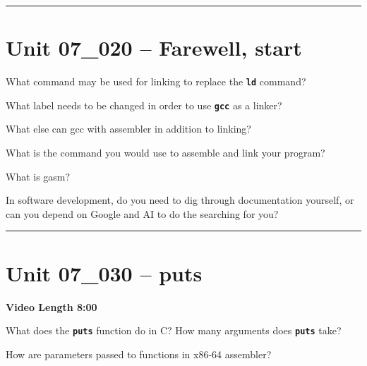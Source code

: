 \documentclass[letterpaper,12pt]{exam}
\newcommand{\unit}{Unit 07}
\begin{document}
\begin{questions}
\rule{0.5\textwidth}{.4pt} %
\section*{\unit\_020 -- Farewell, start }

\begin{samepage}
    \question What command may be used for linking to replace the \texttt{\textbf{ld}} command?
    \vspace{5mm}
\end{samepage}
\par
\begin{samepage}
    \question What label needs to be changed in order to use \texttt{\textbf{gcc}} as a linker?
    \vspace{5mm}
\end{samepage}
\par
 
\begin{samepage}
    \question What else can gcc with assembler in addition to linking?
    \vspace{5mm}
\end{samepage}
\par
\begin{samepage}
    \question What is the command you would use to assemble and link your program?
    \vspace{5mm}
\end{samepage}
\par
 \begin{samepage}
     \question What is gasm?   
     \vspace{5mm}
 \end{samepage}
 \par
  \begin{samepage}
      \question In software development, do you need to dig through documentation yourself, or can you depend on Google and AI to do the searching for you?
      \vspace{5mm}
  \end{samepage}
  \par
\rule{0.5\textwidth}{.4pt} %
\section*{\unit\_030 -- puts }
\par{\selectfont\textbf{Video Length 8:00}}
\begin{samepage}
    \question What does the \texttt{\textbf{puts}} function do in C?  How many arguments does \texttt{\textbf{puts}} take?
    \vspace{5mm}
\end{samepage}
\par
\begin{samepage}
    \question How are parameters passed to functions in x86-64 assembler?
    \vspace{5mm}
\end{samepage}
\par
 

\end{questions}
\end{document}
